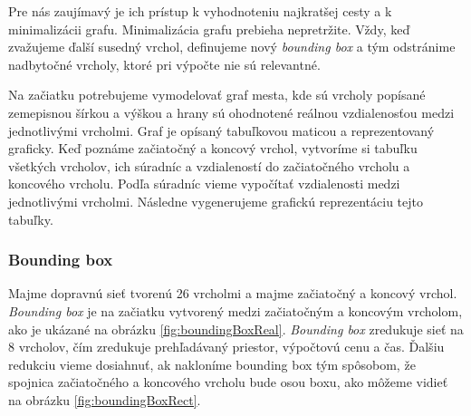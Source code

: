 Pre nás zaujímavý je ich prístup k vyhodnoteniu najkratšej cesty a k minimalizácii grafu. Minimalizácia grafu prebieha nepretržite. Vždy, keď zvažujeme ďalší susedný vrchol, definujeme nový \textit{bounding box} a tým odstránime nadbytočné vrcholy, ktoré pri výpočte nie sú relevantné.

Na začiatku potrebujeme vymodelovať graf mesta, kde sú vrcholy popísané zemepisnou šírkou a výškou a hrany sú ohodnotené reálnou vzdialenosťou medzi jednotlivými vrcholmi. Graf je opísaný tabuľkovou maticou a reprezentovaný graficky. Keď poznáme začiatočný a koncový vrchol, vytvoríme si tabuľku všetkých vrcholov, ich súradníc a vzdialeností do začiatočného vrcholu a koncového vrcholu. Podľa súradníc vieme vypočítať vzdialenosti medzi jednotlivými vrcholmi. Následne vygenerujeme grafickú reprezentáciu tejto tabuľky. 

\subsubsection{Bounding box}
Majme dopravnú sieť tvorenú 26 vrcholmi a majme začiatočný a koncový vrchol. \textit{Bounding box} je na začiatku vytvorený medzi začiatočným a koncovým vrcholom, ako je ukázané na obrázku \ref{fig:boundingBoxReal}. \textit{Bounding box} zredukuje sieť na 8 vrcholov, čím zredukuje prehľadávaný priestor, výpočtovú cenu a čas. Ďalšiu redukciu vieme dosiahnuť, ak nakloníme bounding box tým spôsobom, že spojnica začiatočného a koncového vrcholu bude osou boxu, ako môžeme vidieť na obrázku \ref{fig:boundingBoxRect}. 

